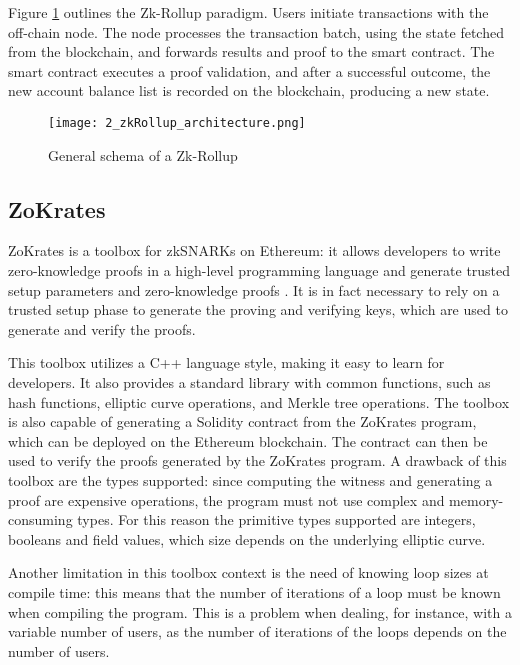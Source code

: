 Figure \ref{fig:2_zkRollup_schema} outlines the Zk-Rollup paradigm. Users initiate transactions with the off-chain node. The node processes the transaction batch, using the state fetched from the blockchain, and forwards results and proof to the smart contract. The smart contract executes a proof validation, and after a successful outcome, the new account balance list is recorded on the blockchain, producing a new state.

\begin{figure}[ht]
  \centering
  \texttt{[image: 2\_zkRollup\_architecture.png]}
  \caption[Zk-Rollup Schema]{General schema of a Zk-Rollup\cite{ise_department_tub_material_nodate}}  
  \label{fig:2_zkRollup_schema}
\end{figure}

\subsection{ZoKrates}
ZoKrates is a toolbox for zkSNARKs on Ethereum: it allows developers to write zero-knowledge proofs in a high-level programming language and generate trusted setup parameters and zero-knowledge proofs \cite{eberhardt_ZoKrates_2018}. It is in fact necessary to rely on a trusted setup phase to generate the proving and verifying keys, which are used to generate and verify the proofs.

This toolbox utilizes a C++ language style, making it easy to learn for developers. It also provides a standard library with common functions, such as hash functions, elliptic curve operations, and Merkle tree operations. The toolbox is also capable of generating a Solidity contract from the ZoKrates program, which can be deployed on the Ethereum blockchain. The contract can then be used to verify the proofs generated by the ZoKrates program. A drawback of this toolbox are the types supported: since computing the witness and generating a proof are expensive operations, the program must not use complex and memory-consuming types. For this reason the primitive types supported are integers, booleans and field values, which size depends on the underlying elliptic curve.

Another limitation in this toolbox context is the need of knowing loop sizes at compile time: this means that the number of iterations of a loop must be known when compiling the program. This is a problem when dealing, for instance, with a variable number of users, as the number of iterations of the loops depends on the number of users.

